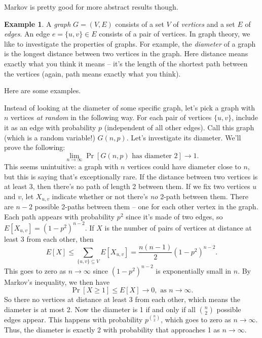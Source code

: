 \documentclass[12pt]{article}
\theoremstyle{plain}
\theoremstyle{definition}
\newtheorem{example}[theorem]{Example}
\theoremstyle{remark}
\begin{document}
Markov is pretty good for more abstract results though.

\begin{example}
    A \emph{graph} $G = (V,E)$ consists of a set $V$ of \emph{vertices} and a set $E$ of \emph{edges}.
    An edge $e = \{u, v\}\in E$ consists of a pair of vertices.
    In graph theory, we like to investigate the properties of graphs.
    For example, the \emph{diameter} of a graph is the longest distance between two vertices in the graph.
    Here distance means exactly what you think it means -- it's the length of the shortest path between the vertices (again, path means exactly what you think).

    Here are some examples.

    Instead of looking at the diameter of some specific graph, let's pick a graph with $n$ vertices \emph{at random} in the following way.
    For each pair of vertices $\{u, v\}$, include it as an edge with probability $p$ (independent of all other edges).
    Call this graph (which is a random variable!) $G(n, p)$.
    Let's investigate its diameter.
    We'll prove the following:
    \[
        \lim_{n\to \infty}\Pr[G(n, p)\text{ has diameter }2]\to 1.
    \]
    This seems unintuitive: a graph with $n$ vertices could have diameter close to $n$, but this is saying that's exceptionally rare.
    If the distance between two vertices is at least 3, then there's no path of length 2 between them.
    If we fix two vertices $u$ and $v$, let $X_{u,v}$ indicate whether or not there's \emph{no} 2-path between them.
    There are $n-2$ possible 2-paths between them -- one for each other vertex in the graph.
    Each path appears with probability $p^2$ since it's made of two edges, so $E[X_{u,v}] = (1-p^2)^{n-2}$.
    If $X$ is the number of pairs of vertices at distance at least 3 from each other, then 
    \[
        E[X] \leq \sum_{\{u,v\}\subseteq V}E[X_{u,v}] = \frac{n(n-1)}{2}(1-p^2)^{n-2}.
    \]
    This goes to zero as $n\to \infty$ since $(1-p^2)^{n-2}$ is exponentially small in $n$.
    By Markov's inequality, we then have
    \[
        \Pr[X\geq 1] \leq E[X] \to 0,\text{ as }n\to \infty.
    \]
    So there no vertices at distance at least 3 from each other, which means the diameter is at most 2.
    Now the diameter is 1 if and only if all $\binom{n}{2}$ possible edges appear.
    This happens with probability $p^{\binom{n}{2}}$, which goes to zero as $n\to \infty$.
    Thus, the diameter is exactly 2 with probability that approaches 1 as $n\to \infty$.
\end{example}
\end{document}
